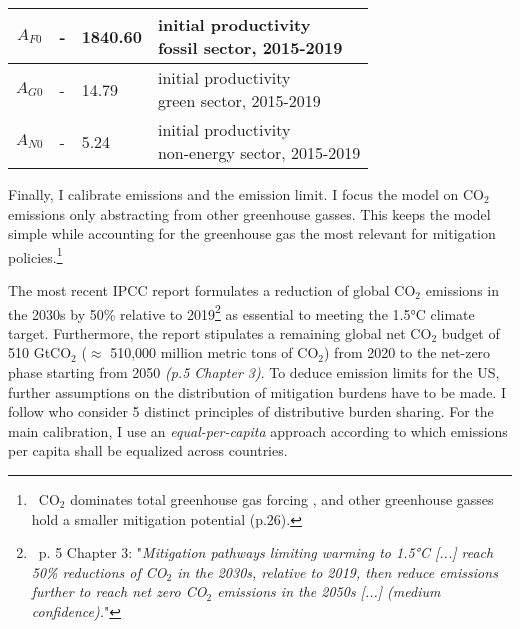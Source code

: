 \begin{table}[h!]
\begin{center}
\begin{tabular}{c|lll}
 			\hline
 			$A_{F0}$&- &1840.60& \makecell[l]{initial productivity \\ fossil sector, 2015-2019}  \\
 			\hline
 			$A_{G0}$&- &14.79& \makecell[l]{initial productivity \\ green sector, 2015-2019}  \\
 			\hline
 			$A_{N0}$&- &5.24& \makecell[l]{initial productivity \\ non-energy sector, 2015-2019}  \\
 			\hline \hline
 		\end{tabular}
 	\end{center}
 \end{table}
 \clearpage
 
 
 Finally, I calibrate emissions and the emission limit.  I focus the model on CO$_2$ emissions only abstracting from other greenhouse gasses. This keeps the model simple while accounting for the greenhouse gas the most relevant for mitigation policies.\footnote{\ CO$_2$ dominates total greenhouse gas forcing \citep[p.29]{IPCC2022}, and other greenhouse gasses hold a smaller mitigation potential (p.26).}
 
 The most recent IPCC report \citep{IPCC2022} formulates a reduction of global CO$_2$ emissions in the 2030s by 50\% relative to 2019\footnote{\ p. 5 Chapter 3: "\textit{Mitigation pathways limiting warming to 1.5°C [...] reach 50\% reductions of CO$_2$ in the 2030s, relative to 2019, then reduce emissions further to reach net zero CO$_2$ emissions in the 2050s [...] (\textnormal{medium confidence}).}"}  as essential to meeting the 1.5°C climate target.  Furthermore, the report stipulates a remaining global net CO$_2$ budget of 510 GtCO$_2$ ($\approx$ 510,000 million metric tons of CO$_2$) from 2020 to the net-zero phase starting from 2050 \textit{(p.5 Chapter 3)}. 
To deduce emission limits for the US, further assumptions on the distribution of mitigation burdens have to be made. I follow \cite{RobiouDuPont2017EquitableGoals} who consider 5 distinct principles of distributive burden sharing. For the main calibration, I use an \textit{equal-per-capita} approach according to which emissions per capita shall be equalized across countries. 
 

